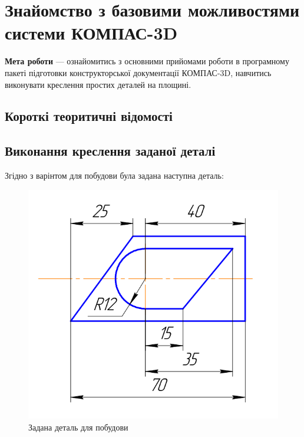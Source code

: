 \chapter[~]{Знайомство з базовими можливостями системи КОМПАС-3D}

\textbf{Мета роботи} --- ознайомитись з основними прийомами роботи в програмному пакеті підготовки
конструкторської документації КОМПАС-3D, навчитись виконувати креслення простих деталей на площині.

\section{Короткі теоритичні відомості}

\section{Виконання креслення заданої деталі}

Згідно з варінтом для побудови була задана наступна деталь:

\begin{figure}[!ht]
  \centering
  \includegraphics[width=0.9\linewidth]{./images/lab3/target-part.png}
  \caption{Задана деталь для побудови}
  \label{fig:lab3:target_part} 
\end{figure}

